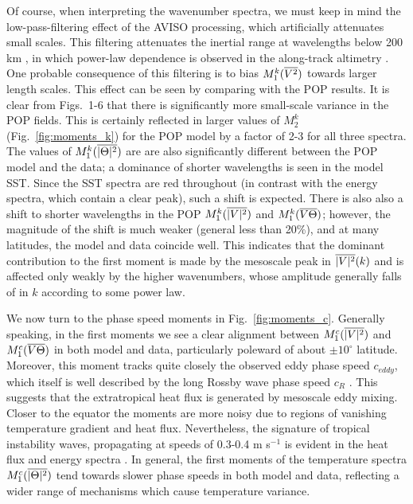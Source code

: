 \documentclass[10pt]{article}
\newcommand{\ol}{\ensuremath{\overline}}
\begin{document}
Of course, when interpreting the wavenumber spectra, we must keep in mind the low-pass-filtering effect of the AVISO processing, which artificially attenuates small scales. This filtering attenuates the inertial range at wavelengths below 200 km \citep{DucetEtAl2000}, in which power-law dependence is observed in the along-track altimetry \citep{XuFu2011}. One probable consequence of this filtering is to bias $M_1^k(\ol{V^2})$ towards larger length scales. This effect can be seen by comparing with the POP results. It is clear from Figs.~1-6 that there is significantly more small-scale variance in the POP fields. This is certainly reflected in larger values of $M_2^k$ (Fig.~\ref{fig:moments_k}) for the POP model by a factor of 2-3 for all three spectra. The values of $M_1^k(\ol{|\Theta|^2})$ are are also significantly different between the POP model and the data; a dominance of shorter wavelengths is seen in the model SST. Since the SST spectra are red throughout (in contrast with the energy spectra, which contain a clear peak), such a shift is expected. There is also also a shift to shorter wavelengths in the POP $M_1^k(\ol{|V|^2})$ and $M_1^k(\ol{V\Theta})$; however, the magnitude of the shift is much weaker (general less than 20\%), and at many latitudes, the model and data coincide well. This indicates that the dominant contribution to the first moment is made by the mesoscale peak in $\ol{|V|^2}(k)$ and is affected only weakly by the higher wavenumbers, whose amplitude generally falls of in $k$ according to some power law.

We now turn to the phase speed moments in Fig.~\ref{fig:moments_c}. Generally speaking, in the first moments we see a clear alignment between $M_1^c(\ol{|V|^2})$ and $M_1^c(\ol{V\Theta})$ in both model and data, particularly poleward of about $\pm 10^\circ$ latitude. Moreover, this moment tracks quite closely the observed eddy phase speed $c_{eddy}$, which itself is well described by the long Rossby wave phase speed $c_R$ \citep{TullochEtAl2009,KlockerAbernathey2014}. This suggests that the extratropical heat flux is generated by mesoscale eddy mixing. Closer to the equator the moments are more noisy due to regions of vanishing temperature gradient and heat flux. Nevertheless, the signature of tropical instability waves, propagating at speeds of 0.3-0.4 m s$^{-1}$ is evident in the heat flux and energy spectra \citep[see also][]{Contreras2002,PolitoEtAl2001}. In general, the first moments of the temperature spectra $M_1^c(\ol{|\Theta|^2})$ tend towards slower phase speeds in both model and data, reflecting a wider range of mechanisms which cause temperature variance.
\end{document}
